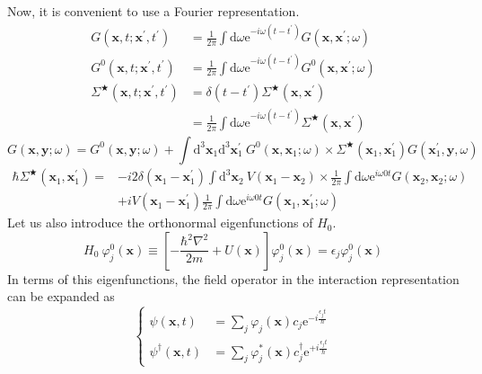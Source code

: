 Now, it is convenient to use a Fourier representation.
\[ \begin{split}
G(\mathbf{x},t;\mathbf{x}^{'},t^{'})&=\frac{1}{2\pi}\int \mathrm{d} \omega \mathrm{e}^{-i \omega (t-t^{'})} G(\mathbf{x},\mathbf{x}^{'};\omega)\\
G^{0}(\mathbf{x},t;\mathbf{x}^{'},t^{'})&=\frac{1}{2\pi}\int \mathrm{d} \omega \mathrm{e}^{-i \omega (t-t^{'})} G^{0}(\mathbf{x},\mathbf{x}^{'};\omega)\\
\Sigma^{\bigstar}(\mathbf{x},t;\mathbf{x}^{'},t^{'})&=
\delta(t-t^{'})\Sigma^{\bigstar}(\mathbf{x},\mathbf{x}^{'})\\
&=\frac{1}{2\pi}\int \mathrm{d} \omega \mathrm{e}^{-i \omega (t-t^{'})}\Sigma^{\bigstar}(\mathbf{x},\mathbf{x}^{'})
\end{split} \]
\begin{equation}
G(\mathbf{x},\mathbf{y};\omega)=G^{0}(\mathbf{x},\mathbf{y};\omega)+\int \mathrm{d}^{3}\mathbf{x}_{1} \mathrm{d}^{3}\mathbf{x}^{'}_{1} \ G^{0}(\mathbf{x},\mathbf{x}_{1};\omega) \times \Sigma^{\bigstar}(\mathbf{x}_{1},\mathbf{x}^{'}_{1})G(\mathbf{x}^{'}_{1},\mathbf{y},\omega)
\label{Eqs2.6.1}\end{equation}
\begin{equation}\begin{split}
\hbar\Sigma^{\bigstar}(\mathbf{x}_{1},\mathbf{x}^{'}_{1})
=&-i 2 \delta(\mathbf{x}_{1}-\mathbf{x}^{'}_{1}) \int \mathrm{d}^{3}\mathbf{x}_{2} \ V(\mathbf{x}_{1}-\mathbf{x}_{2}) \times \frac{1}{2\pi}\int \mathrm{d} \omega \mathrm{e}^{i \omega 0 t} G(\mathbf{x}_{2},\mathbf{x}_{2};\omega)\\
&+i V(\mathbf{x}_{1}-\mathbf{x}^{'}_{1}) \frac{1}{2\pi}\int \mathrm{d} \omega \mathrm{e}^{i \omega 0 t} G(\mathbf{x}_{1},\mathbf{x}_{1}^{'};\omega)
\end{split}\label{Eqs2.6.2}\end{equation}
Let us also introduce the orthonormal eigenfunctions of $H_{0}$.
\[ H_{0} \ \varphi_{j}^{0}(\mathbf{x}) \equiv \left[ -\frac{\hbar^{2}\nabla^{2}}{2m} + U(\mathbf{x}) \right]\varphi_{j}^{0}(\mathbf{x}) = \epsilon_{j}\varphi_{j}^{0}(\mathbf{x}) \]
In terms of  this eigenfunctions, the field operator in the interaction representation can be expanded as
\[ \left \{ \begin{split}
\psi(\mathbf{x},t) &= \sum_{j} \varphi_{j}(\mathbf{x})c_{j}\mathrm{e}^{-i\frac{\epsilon_{j}t}{\hbar}}\\
\psi^{\dagger}(\mathbf{x},t) &= \sum_{j} \varphi^{*}_{j}(\mathbf{x})c_{j}^{\dagger}\mathrm{e}^{+i\frac{\epsilon_{j}t}{\hbar}}
\end{split} \right. \]
